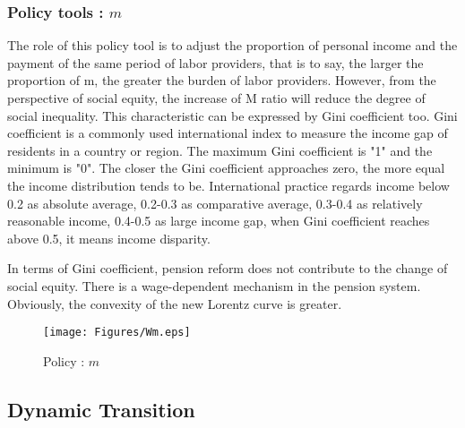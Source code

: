 \documentclass{article}
\begin{document}
        \subsubsection{Policy tools : $m$}
            The role of this policy tool is to adjust the proportion of personal income and the payment of the same period of labor providers, that is to say, the larger the proportion of m, the greater the burden of labor providers. However, from the perspective of social equity, the increase of M ratio will reduce the degree of social inequality. This characteristic can be expressed by Gini coefficient too. Gini coefficient is a commonly used international index to measure the income gap of residents in a country or region. The maximum Gini coefficient is "1" and the minimum is "0". The closer the Gini coefficient approaches zero, the more equal the income distribution tends to be. International practice regards income below 0.2 as absolute average, 0.2-0.3 as comparative average, 0.3-0.4 as relatively reasonable income, 0.4-0.5 as large income gap, when Gini coefficient reaches above 0.5, it means income disparity.

            In terms of Gini coefficient, pension reform does not contribute to the change of social equity. There is a wage-dependent mechanism in the pension system.
            Obviously, the convexity of the new Lorentz curve is greater.

           \begin{figure}[H]
               \centering
               \texttt{[image: Figures/Wm.eps]}
               \caption{Policy : $m$}
           \end{figure}
%

    \subsection{Dynamic Transition}
        
\end{document}

